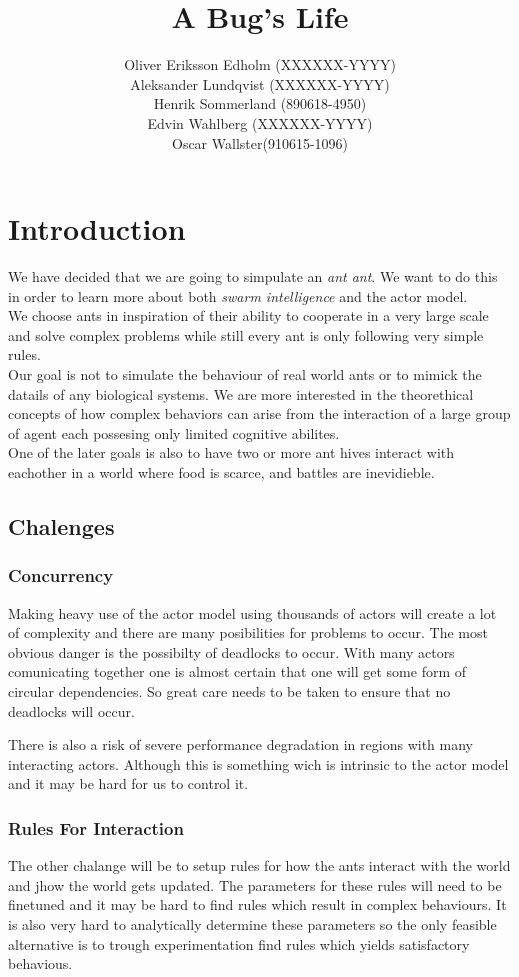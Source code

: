 \documentclass[a4paper]{article}
\title{A Bug's Life}
\author{Oliver Eriksson Edholm (XXXXXX-YYYY) \\
Aleksander Lundqvist (XXXXXX-YYYY) \\
Henrik Sommerland (890618-4950) \\
Edvin Wahlberg (XXXXXX-YYYY) \\
Oscar Wallster(910615-1096)}
\begin{document}
\maketitle

\section{Introduction}
We have decided that we are going to simpulate an \emph{ant ant}. We want to do
this in order to learn more about both \emph{swarm intelligence} and the actor
model.\\
We choose ants in inspiration of their ability to cooperate in a very large
scale and solve complex problems while still every ant is only following very
simple rules.
\\
Our goal is not to simulate the behaviour of real world ants or to mimick the
datails of any biological systems.
We are more interested in the theorethical concepts of how complex behaviors can
arise from the interaction of a large group of agent each possesing only limited
cognitive abilites.\\

One of the later goals is also to have two or more ant hives interact with
eachother in a world where food is scarce, and battles are inevidieble.

\subsection{Chalenges}

\subsubsection{Concurrency}
Making heavy use of the actor model using thousands of actors will create a lot
of complexity and there are many posibilities for problems to occur. The most
obvious danger is the possibilty of deadlocks to occur. With many actors
comunicating together one is almost certain that one will get some form of
circular dependencies. So great care needs to be taken to ensure that no
deadlocks will occur.

There is also a risk of severe performance degradation in regions with many
interacting actors. Although this is something wich is intrinsic to the actor
model and it may be hard for us to control it.

\subsubsection{Rules For Interaction}
The other chalange will be to setup rules for how the ants interact with the
world and jhow the world gets updated. The parameters for these rules will need
to be finetuned and it may be hard to find rules which result in complex
behaviours. It is also very hard to analytically determine these parameters so
the only feasible alternative is to trough experimentation find rules which
yields satisfactory behavious.
\end{document}
